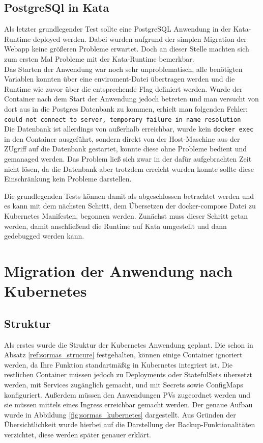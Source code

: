 \subsection{PostgreSQl in Kata}
Als letzter grundlegender Test sollte eine PostgreSQL Anwendung in der Kata-Runtime deployed werden. 
Dabei wurden aufgrund der simplen Migration der Webapp keine größeren Probleme erwartet.
Doch an dieser Stelle machten sich zum ersten Mal Probleme mit der Kata-Runtime bemerkbar.
\\
Das Starten der Anwendung war noch sehr unproblematisch, alle benötigten Variablen konnten über eine enviroment-Datei übertragen werden und die Runtime wie zuvor über die entsprechende Flag definiert werden. 
Wurde der Container nach dem Start der Anwendung jedoch betreten und man versucht von dort aus in die Postgres Datenbank zu kommen, erhielt man folgenden Fehler:
\\\texttt{could not connect to server, temporary failure in name resolution}\\
Die Datenbank ist allerdings von außerhalb erreichbar, wurde kein \texttt{docker exec} in den Container ausgeführt, sondern direkt von der Host-Maschine aus der ZUgriff auf die Datenbank gestartet, konnte diese ohne Probleme bedient und gemanaged werden. 
Das Problem ließ sich zwar in der dafür aufgebrachten Zeit nicht lösen, da die Datenbank aber trotzdem erreicht wurden konnte sollte diese Einschränkung kein Probleme darstellen. 

Die grundlegenden Tests können damit als abgeschlossen betrachtet werden und es kann mit dem nächsten Schritt, dem Übersetzen der docker-compose Datei zu Kubernetes Manifesten, begonnen werden. 
Zunächst muss dieser Schritt getan werden, damit anschließend die Runtime auf Kata umgestellt und dann gedebugged werden kann. 


\section{Migration der Anwendung nach Kubernetes}
\subsection{Struktur}
Als erstes wurde die Struktur der Kubernetes Anwendung geplant. 
Die schon in Absatz \ref{ref:sormas_strucure} festgehalten, können einige Container ignoriert werden, da Ihre Funktion standartmäßig in Kubernetes integriert ist. 
Die restlichen Container müssen jedoch zu Deployments oder StatefulSets übersetzt werden, mit Services zugänglich gemacht, und mit Secrets sowie ConfigMaps konfiguriert. 
Außerdem müssen den Anwendungen \ac{PV}s zugeordnet werden und sie müssen mittels eines Ingress erreichbar gemacht werden.
Der genaue Aufbau wurde in Abbildung \ref{fig:sormas_kubernetes} dargestellt. 
Aus Gründen der Übersichtlichkeit wurde hierbei auf die Darstellung der Backup-Funktionalitäten verzichtet, diese werden später genauer erklärt.

